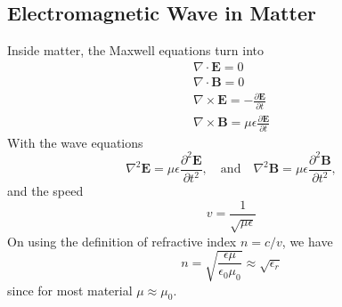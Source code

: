 \documentclass[../../../main.tex]{subfiles}
\begin{document}
\subsection*{Electromagnetic Wave in Matter}
Inside matter, the Maxwell equations turn into
\begin{gather*}
    \nabla\cdot\mathbf{E}=0\\
    \nabla\cdot\mathbf{B}=0\\
    \nabla\times\mathbf{E}=-\frac{\partial \mathbf{E}}{\partial t}\\
    \nabla\times\mathbf{B}=\mu\epsilon\frac{\partial \mathbf{E}}{\partial t}
\end{gather*}
With the wave equations
\begin{equation*}
    \nabla^2\mathbf{E}=\mu\epsilon\frac{\partial^2\mathbf{E}}{\partial t^2},\quad\text{and}\quad \nabla^2\mathbf{B}=\mu\epsilon\frac{\partial^2\mathbf{B}}{\partial t^2},
\end{equation*}
and the speed
\begin{equation*}
    v=\frac{1}{\sqrt{\mu\epsilon}}
\end{equation*}
On using the definition of refractive index $n=c/v$, we have
\begin{equation*}
    n=\sqrt{\frac{\epsilon\mu}{\epsilon_0\mu_0}}\approx\sqrt{\epsilon_r}
\end{equation*}
since for most material $\mu\approx\mu_0$.
\end{document}
